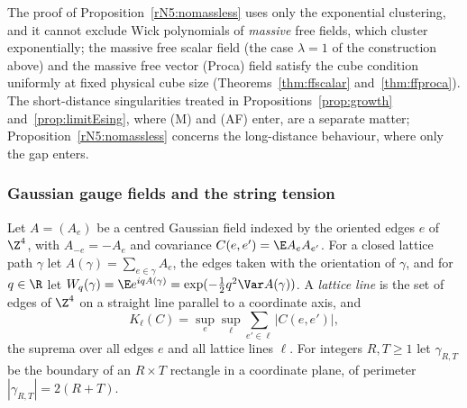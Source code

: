 \begin{remark}\label{rN5:rem:massive}
The proof of Proposition~\ref{rN5:nomassless} uses only the exponential
clustering, and it cannot exclude Wick polynomials of \emph{massive} free
fields, which cluster exponentially; the massive free scalar field (the case
$\lambda=1$ of the construction above) and the massive free vector (Proca)
field satisfy the cube condition uniformly at fixed physical cube size
(Theorems~\ref{thm:ffscalar} and~\ref{thm:ffproca}). The short-distance
singularities treated in Propositions~\ref{prop:growth}
and~\ref{prop:limitEsing}, where (M) and (AF) enter, are a separate matter;
Proposition~\ref{rN5:nomassless} concerns the long-distance behaviour, where
only the gap enters.
\end{remark}

\subsubsection{Gaussian gauge fields and the string tension}

Let $A=(A_e)$ be a centred Gaussian field indexed by the oriented edges
$e$ of $\Z^4$, with $A_{-e}=-A_e$ and covariance $C(e,e')=\E A_eA_{e'}$. For a
closed lattice path $\gamma$ let $A(\gamma)=\sum_{e\in\gamma}A_e$, the edges
taken with the orientation of $\gamma$, and for $q\in\R$ let $W_q(\gamma)=\E
e^{iqA(\gamma)}=\exp(-\frac12q^2\Var A(\gamma))$. A \emph{lattice line} is
the set of edges of $\Z^4$ on a straight line parallel to a coordinate axis,
and
\[
K_\ell(C)=\sup_e\sup_\ell\sum_{e'\in\ell}|C(e,e')| ,
\]
the suprema over all edges $e$ and all lattice lines $\ell$. For integers
$R,T\ge1$ let $\gamma_{R,T}$ be the boundary of an $R\times T$ rectangle in a
coordinate plane, of perimeter $|\gamma_{R,T}|=2(R+T)$.

